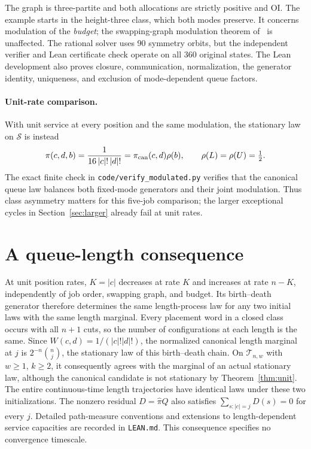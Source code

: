 \documentclass[11pt]{article}
\theoremstyle{remark}
\newcommand{\T}{\mathcal T_{n,w}}
\begin{document}
The graph is three-partite and both allocations are strictly positive and OI. The example starts in the height-three class, which both modes preserve. It concerns modulation of the \emph{budget}; the swapping-graph modulation theorem of~\cite[Theorem~6]{DG} is unaffected. The rational solver uses 90 symmetry orbits, but the independent verifier and Lean certificate check operate on all 360 original states. The Lean development also proves closure, communication, normalization, the generator identity, uniqueness, and exclusion of mode-dependent queue factors.

\paragraph{Unit-rate comparison.}
With unit service at every position and the same modulation, the stationary law on $\mathcal S$ is instead
\[
 \pi(c,d,b)=\frac{1}{16\,|c|!\,|d|!}
           =\pi_{\rm can}(c,d)\rho(b),\qquad \rho(L)=\rho(U)=\tfrac12.
\]
The exact finite check in \texttt{code/verify\_modulated.py} verifies that the canonical queue law balances both fixed-mode generators and their joint modulation. Thus class asymmetry matters for this five-job comparison; the larger exceptional cycles in Section~\ref{sec:larger} already fail at unit rates.

\section{A queue-length consequence}\label{sec:length}
At unit position rates, $K=|c|$ decreases at rate $K$ and increases at rate $n-K$, independently of job order, swapping graph, and budget. Its birth--death generator therefore determines the same length-process law for any two initial laws with the same length marginal. Every placement word in a closed class occurs with all $n+1$ cuts, so the number of configurations at each length is the same. Since $W(c,d)=1/(|c|!|d|!)$, the normalized canonical length marginal at $j$ is $2^{-n}\binom nj$, the stationary law of this birth--death chain. On $\T$ with $w\ge1$, $k\ge2$, it consequently agrees with the marginal of an actual stationary law, although the canonical candidate is not stationary by Theorem~\ref{thm:unit}. The entire continuous-time length trajectories have identical laws under these two initializations. The nonzero residual $D=\widehat\pi Q$ also satisfies $\sum_{s:|c|=j}D(s)=0$ for every $j$. Detailed path-measure conventions and extensions to length-dependent service capacities are recorded in \texttt{LEAN.md}. This consequence specifies no convergence timescale.
\end{document}
